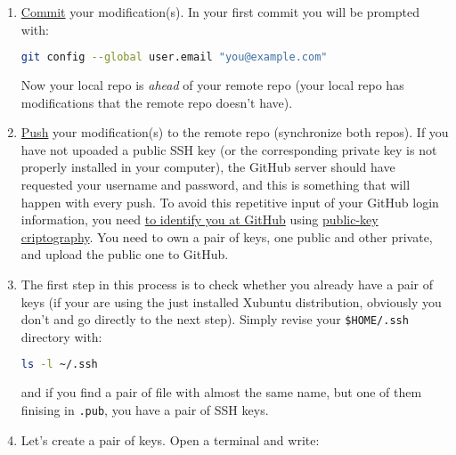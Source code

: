 \begin{enumerate}
  \begin{lstlisting}[language=markdown}
    See the [Hello World](https://guides.github.com/activities/hello-world/) guide at GitHub.
  \end{lstlisting}
  
\item
  \href{https://docs.github.com/en/github/getting-started-with-github/github-glossary#commit}{Commit}
  your modification(s). In your first commit you will be prompted
  with:

  \begin{lstlisting}[language=bash]
    git config --global user.email "you@example.com"
  \end{lstlisting}

  Now your local repo is \emph{ahead} of your remote repo (your local
  repo has modifications that the remote repo doesn't have).

\item
  \href{https://docs.github.com/en/github/getting-started-with-github/github-glossary#push}{Push}
  your modification(s) to the remote repo (synchronize both repos). If
  you have not upoaded a public SSH key (or the corresponding private
  key is not properly installed in your computer), the GitHub server
  should have requested your username and password, and this is
  something that will happen with every push. To avoid this repetitive
  input of your GitHub login information, you need
  \href{https://docs.github.com/en/github/authenticating-to-github/connecting-to-github-with-ssh}{to
    identify you at GitHub} using
  \href{https://en.wikipedia.org/wiki/Public-key_cryptography}{public-key
    criptography}. You need to own a pair of keys, one public and
  other private, and upload the public one to GitHub.
  
\item The first step in this process is to check whether you already
  have a pair of keys (if your are using the just installed Xubuntu
  distribution, obviously you don't and go directly to the next
  step). Simply revise your \texttt{\$HOME/.ssh} directory with:

  \begin{lstlisting}[language=bash]
    ls -l ~/.ssh
  \end{lstlisting}

  and if you find a pair of file with almost the same name, but one of
  them finising in \texttt{.pub}, you have a pair of SSH keys.

\item Let's create a pair of keys. Open a terminal and write:


\end{enumerate}
